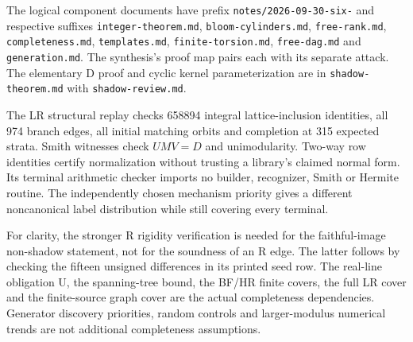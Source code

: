 \documentclass[11pt]{article}
\theoremstyle{remark}
\newcommand{\code}[1]{\nolinkurl{#1}}
\begin{document}
The logical component documents have prefix
\code{notes/2026-09-30-six-} and respective suffixes
\code{integer-theorem.md}, \code{bloom-cylinders.md},
\code{free-rank.md}, \code{completeness.md}, \code{templates.md},
\code{finite-torsion.md}, \code{free-dag.md} and
\code{generation.md}. The synthesis's proof map pairs each with its
separate attack. The elementary D proof and cyclic kernel parameterization
are in \code{shadow-theorem.md} with \code{shadow-review.md}.

The LR structural replay checks 658894 integral lattice-inclusion identities,
all 974 branch edges, all initial matching orbits and completion at 315
expected strata. Smith witnesses check $UMV=D$ and unimodularity.
Two-way row identities certify normalization without trusting a library's
claimed normal form. Its terminal arithmetic checker imports no builder,
recognizer, Smith or Hermite routine. The independently chosen mechanism
priority gives a different noncanonical label distribution while still
covering every terminal.

For clarity, the stronger R rigidity verification is needed for the
faithful-image non-shadow statement, not for the soundness of an R edge.
The latter follows by checking the fifteen unsigned differences in its
printed seed row. The real-line obligation U, the spanning-tree bound,
the BF/HR finite covers, the full LR cover and the finite-source graph
cover are the actual completeness dependencies. Generator discovery
priorities, random controls and larger-modulus numerical trends are not
additional completeness assumptions.
\end{document}

